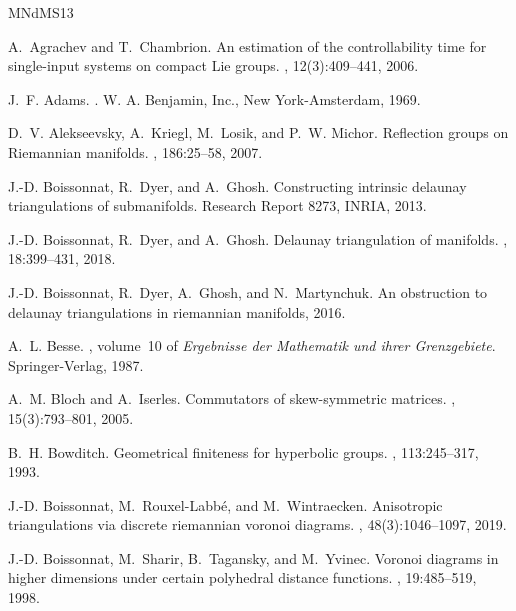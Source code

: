 \documentclass[11pt,twoside]{amsart}
\theoremstyle{plain}
\begin{document}
\printbibliography
%
%
\iffalse
\begin{thebibliography}{MNdMS13}

A.~Agrachev and T.~Chambrion.
\newblock An estimation of the controllability time for single-input systems on
  compact {L}ie groups.
, 12(3):409--441, 2006.

J.~F. Adams.
.
\newblock W. A. Benjamin, Inc., New York-Amsterdam, 1969.

D.~V. Alekseevsky, A.~Kriegl, M.~Losik, and P.~W. Michor.
\newblock Reflection groups on {R}iemannian manifolds.
, 186:25--58, 2007.

J.-D. Boissonnat, R.~Dyer, and A.~Ghosh.
\newblock Constructing intrinsic delaunay triangulations of submanifolds.
\newblock Research Report 8273, INRIA, 2013.

J.-D. Boissonnat, R.~Dyer, and A.~Ghosh.
\newblock Delaunay triangulation of manifolds.
, 18:399--431, 2018.

J.-D. Boissonnat, R.~Dyer, A.~Ghosh, and N.~Martynchuk.
\newblock An obstruction to delaunay triangulations in riemannian manifolds,
  2016.

A.~L. Besse.
, volume~10 of {\em Ergebnisse der Mathematik
  und ihrer Grenzgebiete}.
\newblock Springer-Verlag, 1987.

A.~M. Bloch and A.~Iserles.
\newblock Commutators of skew-symmetric matrices.
, 15(3):793--801,
  2005.

B.~H. Bowditch.
\newblock Geometrical finiteness for hyperbolic groups.
, 113:245--317, 1993.

J.-D. Boissonnat, M.~Rouxel-Labb\'{e}, and M.~Wintraecken.
\newblock Anisotropic triangulations via discrete riemannian voronoi diagrams.
, 48(3):1046--1097, 2019.

J.-D. Boissonnat, M.~Sharir, B.~Tagansky, and M.~Yvinec.
\newblock Voronoi diagrams in higher dimensions under certain polyhedral
  distance functions.
, 19:485--519, 1998.


\end{thebibliography}
\end{document}
